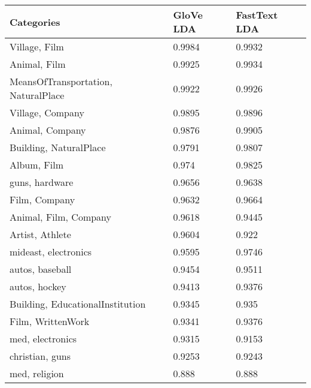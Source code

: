 \begin{table}[]
\centering
\captionsetup{position=bottom}
\begin{tabular}{lll}
\toprule
Categories                      & GloVe LDA       & FastText LDA \\
\midrule
Village, Film                               & 0.9984       & 0.9932                 \\
Animal, Film                                & 0.9925       & 0.9934                 \\
MeansOfTransportation, NaturalPlace          & 0.9922       & 0.9926                 \\
Village, Company                            & 0.9895       & 0.9896                 \\
Animal, Company                             & 0.9876       & 0.9905                 \\
Building, NaturalPlace                      & 0.9791       & 0.9807                 \\
Album, Film                                 & 0.974        & 0.9825                 \\
guns, hardware                              & 0.9656       & 0.9638                 \\
Film, Company                               & 0.9632       & 0.9664                 \\
Animal, Film, Company                        & 0.9618       & 0.9445                 \\
Artist, Athlete                             & 0.9604       & 0.922                  \\
mideast, electronics                        & 0.9595       & 0.9746                 \\
autos, baseball                             & 0.9454       & 0.9511                 \\
autos, hockey                               & 0.9413       & 0.9376                 \\
Building, EducationalInstitution            & 0.9345       & 0.935                  \\
Film, WrittenWork                           & 0.9341       & 0.9376                 \\
med, electronics                            & 0.9315       & 0.9153                 \\
christian, guns                             & 0.9253       & 0.9243                 \\
med, religion                               & 0.888        & 0.888                  \\

\end{tabular}
\end{table}
